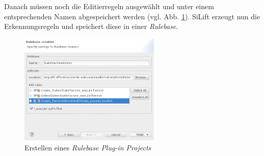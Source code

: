 Danach müssen noch die Editierregeln ausgewählt und unter einem entsprechenden Namen abgespeichert werden (vgl. Abb. \ref{silift-wizard_rulebase_page03}).
SiLift erzeugt nun die Erkennungsregeln und speichert diese in einer \textit{Rulebase}.

\begin{figure}[H]
\centering
\includegraphics[width=0.6\textwidth]{recognitionrules/graphics/silift-wizard_rulebase_page03.png}
\caption{Erstellen eines \textit{Rulebase Plug-in Projects}}
\label{silift-wizard_rulebase_page03}
\end{figure}

